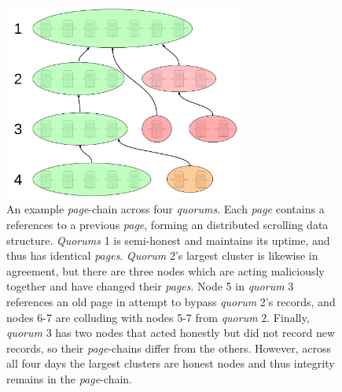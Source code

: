 \begin{figure}[htbp]
	\centering
	\includegraphics[width=0.7\textwidth]{images/LucidCharts/Page-chain.png}
	\caption{An example \emph{page}-chain across four \emph{quorums}. Each \emph{page} contains a references to a previous \emph{page}, forming an distributed scrolling data structure. \emph{Quorums} 1 is semi-honest and maintains its uptime, and thus has identical \emph{pages}. \emph{Quorum} 2's largest cluster is likewise in agreement, but there are three nodes which are acting maliciously together and have changed their \emph{pages}. Node 5 in \emph{quorum} 3 references an old page in attempt to bypass \emph{quorum} 2's records, and nodes 6-7 are colluding with nodes 5-7 from \emph{quorum} 2. Finally, \emph{quorum} 3 has two nodes that acted honestly but did not record new records, so their \emph{page}-chains differ from the others. However, across all four days the largest clusters are honest nodes and thus integrity remains in the \emph{page}-chain.}
\end{figure}



